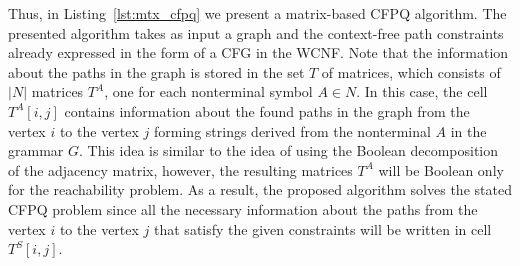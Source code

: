 Thus, in Listing~\ref{lst:mtx_cfpq} we present a matrix-based CFPQ algorithm. The presented algorithm takes as input a graph and the context-free path constraints already expressed in the form of a CFG in the WCNF. Note that the information about the paths in the graph is stored in the set $T$ of matrices, which consists of $|N|$ matrices $T^A$, one for each nonterminal symbol $A \in N$. In this case, the cell $T^A[i, j]$ contains information about the found paths in the graph from the vertex $i$ to the vertex $j$ forming strings derived from the nonterminal $A$ in the grammar $G$. This idea is similar to the idea of using the Boolean decomposition of the adjacency matrix, however, the resulting matrices $T^A$ will be Boolean only for the reachability problem. As a result, the proposed algorithm solves the stated CFPQ problem since all the necessary information about the paths from the vertex $i$ to the vertex $j$ that satisfy the given constraints will be written in cell $T^S[i, j]$.


